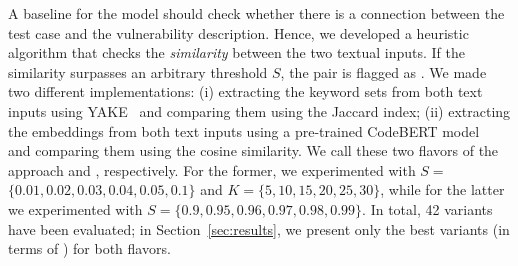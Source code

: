 A baseline for the \linker model should check whether there is a connection between the test case and the vulnerability description.
Hence, we developed a heuristic algorithm that checks the \textit{similarity} between the two textual inputs.
If the similarity surpasses an arbitrary threshold $S$, the pair is flagged as \linkerPosClass.
We made two different implementations: (i) extracting the keyword sets from both text inputs using YAKE~\cite{campos:2020:yake} and comparing them using the Jaccard index; (ii) extracting the embeddings from both text inputs using a pre-trained CodeBERT model~\cite{feng:emnlp2020:codebert} and comparing them using the cosine similarity.
We call these two flavors of the approach \yakeSimil and \codebertSimil, respectively.
For the former, we experimented with $S$$=$$\{0.01,0.02,0.03,0.04,0.05,0.1\}$ and $K$$=$$\{5,10,15,20,25,30\}$, while for the latter we experimented with $S$$=$$\{0.9,0.95,0.96,0.97,0.98,0.99\}$.
In total, 42 variants have been evaluated; in Section~\ref{sec:results}, we present only the best variants (in terms of \metricForTest) for both flavors.
%


